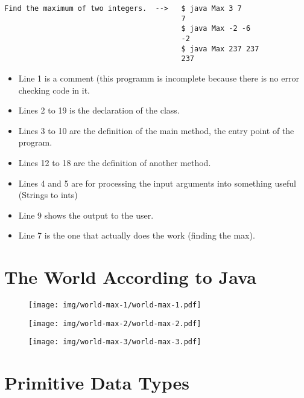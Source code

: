 \documentclass[8pt, a4paper, oneside]{extarticle}
\begin{document}
\begin{Verbatim}
Find the maximum of two integers.  -->   $ java Max 3 7
                                         7
                                         $ java Max -2 -6
                                         -2
                                         $ java Max 237 237
                                         237
\end{Verbatim}
\newpage
\begin{multicols}{2}
\columnbreak

\begin{itemize}

  \item Line 1 is a comment (this programm is incomplete because there is no
    error checking code in it.

  \item Lines 2 to 19 is the declaration of the class.

  \item Lines 3 to 10 are the definition of the main method, the entry point of
    the program.

  \item Lines 12 to 18 are the definition of another method.

  \item Lines 4 and 5 are for processing the input arguments into something
    useful (Strings to ints)

  \item Line 9 shows the output to the user.

  \item Line 7 is the one that actually does the work (finding the max).

\end{itemize}

\end{multicols}

\section{The World According to Java}

\begin{figure}[!ht]
  \centering
  \texttt{[image: img/world-max-1/world-max-1.pdf]}
\end{figure}
\begin{figure}[!ht]
  \centering
  \begin{minipage}{.5\textwidth}
    \centering
    \texttt{[image: img/world-max-2/world-max-2.pdf]}
  \end{minipage}%
  \begin{minipage}{.5\textwidth}
    \centering
    \texttt{[image: img/world-max-3/world-max-3.pdf]}
  \end{minipage}
\end{figure}


\section{Primitive Data Types}
\end{document}
